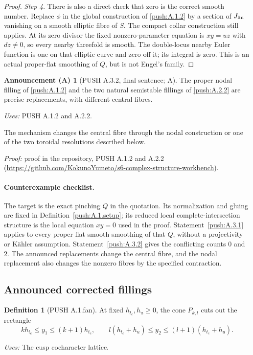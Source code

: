 \documentclass[11pt,a4paper]{article}
\theoremstyle{plain}
\theoremstyle{definition}
\newtheorem{announcement}[theorem]{Announcement (A)}
\newtheorem{definition}[theorem]{Definition}
\begin{document}
\begin{proof}
\par\noindent\textit{Step 4.} There is also a direct check that zero is the correct smooth
number. Replace $\phi$ in the global construction of \ref{push:A.1.2}
by a section of $J_{\rm lin}$ vanishing on a smooth elliptic fibre of
$S$. The compact collar construction still applies. At its
zero divisor the fixed nonzero-parameter equation is $xy=uz$
with $dz\ne0$, so every nearby threefold is smooth. The
double-locus nearby Euler function is one on that elliptic
curve and zero off it; its integral is zero. This is an actual
proper-flat smoothing of $Q$, but is not Engel's family.
\end{proof}

\begin{announcement}[PUSH A.3.2, final sentence; A]\label{push:A.3.2.replacement}
The proper nodal
filling of \ref{push:A.1.2} and the two natural semistable fillings of
\ref{push:A.2.2} are precise replacements, with different central fibres.
\end{announcement}
\noindent\emph{Uses:} PUSH A.1.2 and A.2.2.\par
The mechanism changes the central fibre through the nodal construction or one of the two toroidal resolutions described below.

\noindent\emph{Proof:} proof in the repository, PUSH A.1.2 and A.2.2 (\url{https://github.com/KokunoYumeto/s6-complex-structure-workbench}).
\paragraph{Counterexample checklist.}
The target is the exact pinching $Q$ in the quotation. Its normalization
and gluing are fixed in Definition~\ref{push:A.1.setup}; its reduced local
complete-intersection structure is the local equation $xy=0$ used in
the proof. Statement~\ref{push:A.3.1} applies to every proper flat smooth
smoothing of that $Q$, without a projectivity or K\"ahler assumption.
Statement~\ref{push:A.3.2} gives the conflicting counts $0$ and $2$.
The announced replacements change the central fibre, and the nodal
replacement also changes the nonzero fibres by the specified contraction.
\subsection{Announced corrected fillings}
\begin{definition}[PUSH A.1.fan]\label{push:A.1.fan}
At fixed $h_{t_c},h_u\geq0$, the cone $P_{k,l}$ cuts out the rectangle
\[
 kh_{t_c}\leq y_1\leq(k+1)h_{t_c},\qquad
 l(h_{t_c}+h_u)\leq y_2\leq(l+1)(h_{t_c}+h_u).
\]
\end{definition}
\noindent\emph{Uses:} The cusp cocharacter lattice.\par
\end{document}
